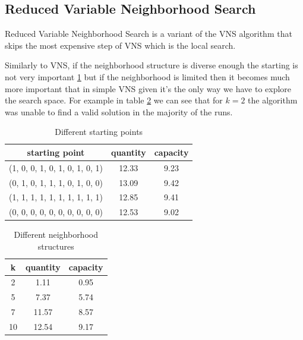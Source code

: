 \subsection{Reduced Variable Neighborhood Search}
Reduced Variable Neighborhood Search is a variant of the VNS algorithm that skips the most expensive step of VNS which is the local search.

Similarly to VNS, if the neighborhood structure is diverse enough the starting is not very important \ref{tab:rvns-start} but if the neighborhood is limited then it becomes much more important that in simple VNS given it's the only way we have to explore the search space. For example in table \ref{tab:rvns-neigh} we can see that for $k=2$ the algorithm was unable to find a valid solution in the majority of the runs.
\begin{table}[H]
    \centering
    \begin{tabular}{c||c |c}
        starting point                 & quantity & capacity \\ \hline
        (1, 0, 0, 1, 0, 1, 0, 1, 0, 1) & 12.33    & 9.23     \\
        (0, 1, 0, 1, 1, 1, 0, 1, 0, 0) & 13.09    & 9.42     \\
        (1, 1, 1, 1, 1, 1, 1, 1, 1, 1) & 12.85    & 9.41     \\
        (0, 0, 0, 0, 0, 0, 0, 0, 0, 0) & 12.53    & 9.02     \\
    \end{tabular}
    \caption{Different starting points}
    \label{tab:rvns-start}
\end{table}
\begin{table}[H]
    \centering
    \begin{tabular}{c||c |c}
        k  & quantity & capacity \\ \hline
        2  & 1.11     & 0.95     \\
        5  & 7.37     & 5.74     \\
        7  & 11.57    & 8.57     \\
        10 & 12.54    & 9.17     \\
    \end{tabular}
    \caption{Different neighborhood structures}
    \label{tab:rvns-neigh}
\end{table}